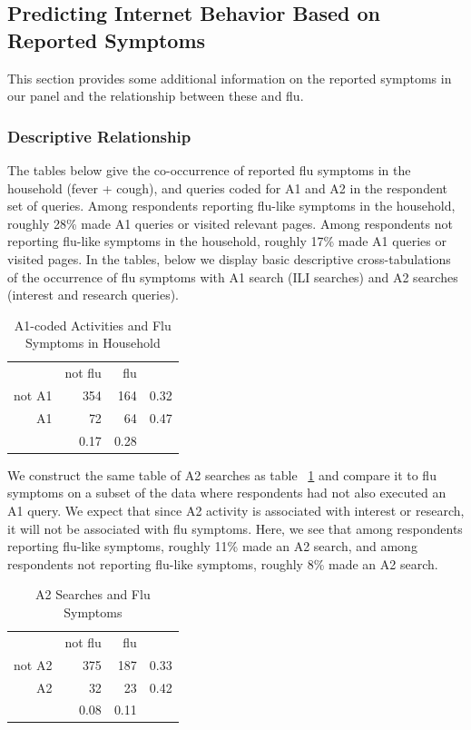 \documentclass[12pt]{article}
\begin{document}
\subsection{Predicting Internet Behavior Based on Reported Symptoms}

This section provides some additional information on the reported symptoms in our panel and the relationship between these and flu.

\subsubsection{Descriptive Relationship}

The tables below give the co-occurrence of reported flu symptoms in the household (fever + cough), and queries coded for A1 and A2 in the respondent set of queries. Among respondents reporting flu-like symptoms in the household, roughly 28\% made A1 queries or visited relevant pages. Among respondents not reporting flu-like symptoms in the household, roughly 17\% made A1 queries or visited pages. In the tables, below we display basic descriptive cross-tabulations of the occurrence of flu symptoms with A1 search (ILI searches) and A2 searches (interest and research queries).

\begin{table}[!htbp]
\centering
  \caption{A1-coded Activities and Flu Symptoms in Household} 
  \label{descript3} 
\begin{tabular}{rrrr}
  \hline
    & not flu &  flu & \\
not A1 & 354 & 164 & 0.32\\
A1 & 72 & 64 & 0.47 \\
   \hline
   & 0.17 & 0.28 &  \\
   \hline
\end{tabular}
\end{table}

We construct the same table of A2 searches as table ~\ref{descript3} and compare it to flu symptoms on a subset of the data where respondents had not also executed an A1 query. We expect that since A2 activity is associated with interest or research, it will not be associated with flu symptoms. Here, we see that among respondents reporting flu-like symptoms, roughly 11\% made an A2 search, and among respondents not reporting flu-like symptoms, roughly 8\% made an A2 search. 

\begin{table}[!htbp]
\centering
  \caption{A2 Searches and Flu Symptoms} 
  \label{descript4} 
\begin{tabular}{rrrr}
  \hline
    & not flu &  flu & \\
not A2 & 375 & 187 & 0.33 \\
A2 & 32 & 23 & 0.42 \\
   \hline
   & 0.08 & 0.11 & \\
   \hline
\end{tabular}
\end{table}
\end{document}
